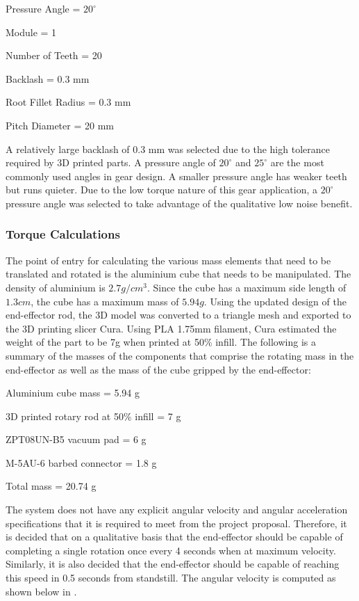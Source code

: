 \begin{compactitem}
    \item Pressure Angle = $20 ^\circ$
    \item Module = 1
    \item Number of Teeth = 20
    \item Backlash = 0.3 mm
    \item Root Fillet Radius = 0.3 mm
    \item Pitch Diameter = 20 mm
\end{compactitem}

A relatively large backlash of 0.3 mm was selected due to the high tolerance required by 3D printed parts. A pressure angle of $20 ^\circ$ and $25 ^\circ$ are the most commonly used angles in gear design. A smaller pressure angle has weaker teeth but runs quieter. Due to the low torque nature of this gear application, a $20 ^\circ$ pressure angle was selected to take advantage of the qualitative low noise benefit.

\subsubsection{Torque Calculations}

The point of entry for calculating the various mass elements that need to be translated and rotated is the aluminium cube that needs to be manipulated. The density of aluminium is $2.7 g/cm^3$. Since the cube has a maximum side length of $1.3 cm$, the cube has a maximum mass of $5.94 g$. Using the updated design of the end-effector rod, the 3D model was converted to a triangle mesh and exported to the 3D printing slicer Cura. Using PLA 1.75mm filament, Cura estimated the weight of the part to be 7g when printed at 50\% infill. The following is a summary of the masses of the components that comprise the rotating mass in the end-effector as well as the mass of the cube gripped by the end-effector:

\begin{compactitem}
    \item Aluminium cube mass = 5.94 g
    \item 3D printed rotary rod at 50\% infill = 7 g
    \item ZPT08UN-B5 vacuum pad = 6 g
    \item M-5AU-6 barbed connector = 1.8 g
    \item Total mass = 20.74 g
\end{compactitem}

The system does not have any explicit angular velocity and angular acceleration specifications that it is required to meet from the project proposal. Therefore, it is decided that on a qualitative basis that the end-effector should be capable of completing a single rotation once every 4 seconds when at maximum velocity. Similarly, it is also decided that the end-effector should be capable of reaching this speed in 0.5 seconds from standstill. The angular velocity is computed as shown below in .

